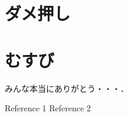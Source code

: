 \documentclass[a4j,12pt,oneside,openany]{jsbook}
\begin{document}
\chapter{ダメ押し}

\chapter{むすび}

\begin{acknowledgement}
みんな本当にありがとう・・・．
\end{acknowledgement}

\begin{thebibliography}{99}
 Reference 1
 Reference 2
\end{thebibliography}
%
%
\end{document}

